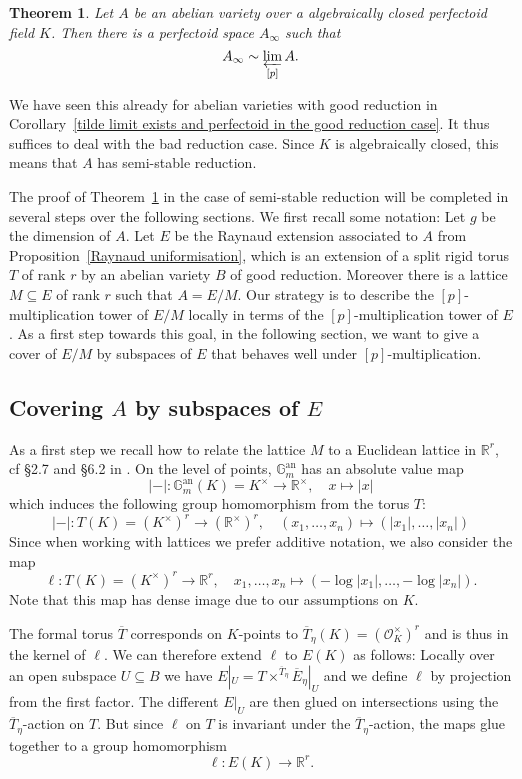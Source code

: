 \documentclass[10pt,oneside]{amsart}
\newtheorem{theorem}{Theorem}[section]
\theoremstyle{definition}
\begin{document}
	\begin{theorem}\label{main theorem}
		Let $A$ be an abelian variety over a  algebraically closed perfectoid field $K$. Then there is a perfectoid space $A_\infty$ such that
				\[A_\infty \sim \varprojlim_{[p]} A.\]
	\end{theorem}
	
	We have seen this already for abelian varieties with good reduction in Corollary~\ref{tilde limit exists and perfectoid in the good reduction case}. It thus suffices to deal with the bad reduction case. Since $K$ is algebraically closed, this means that $A$ has semi-stable reduction.
	
	The proof of Theorem~\ref{main theorem}  in the case of semi-stable reduction will be completed in several steps over the following sections.  We first recall some notation:  Let $g$ be the dimension of $A$. Let $E$ be the Raynaud extension associated to $A$ from Proposition~\ref{Raynaud uniformisation}, which is an extension of a split rigid torus $T$ of rank $r$ by an abelian variety $B$ of good reduction. Moreover there is a lattice $M\subseteq E$ of rank $r$ such that $A=E/M$. Our strategy is to describe the $[p]$-multiplication tower of $E/M$ locally in terms of the $[p]$-multiplication tower of $E$.
	As a first step towards this goal, in the following section, we want to give a cover of $E/M$ by subspaces of $E$ that behaves well under $[p]$-multiplication.
	
	\subsection{Covering $A$ by subspaces of $E$}
	As a first step we recall how to relate the lattice $M$ to a Euclidean lattice in $\mathbb R^r$, cf \S2.7 and \S6.2 in  \cite{rigid geometry of curves}. On the level of points, $\mathbb{G}_m^{\operatorname{an}}$ has an absolute value map
	\[|-|:\mathbb{G}_m^{\operatorname{an}}(K)=K^\times\rightarrow \mathbb R^\times, \quad x\mapsto |x|\]
	which induces the following group homomorphism from the torus $T$:
	\[|-|:T(K)=(K^\times)^r\rightarrow (\mathbb R^\times)^r, \quad (x_1,\dots,x_n)\mapsto (|x_1|,\dots,|x_n|)\]
	Since when working with lattices we prefer additive notation, we also consider the map
	\[\ell:T(K)=(K^\times)^r\rightarrow \mathbb R^r, \quad x_1,\dots,x_n\mapsto (-\log |x_1|,\dots,-\log |x_n|).\]
	Note that this map has dense image due to our assumptions on $K$.
	
		The formal torus $\overline{T}$ corresponds on $K$-points to $\overline{T}_\eta(K) = (\mathcal O_K^\times)^r$ and is thus in the kernel of $\ell$. We can therefore extend $\ell$ to $E(K)$ as follows: Locally over an open subspace $U\subseteq B$ we have $E|_U = T\times^{\overline{T}_\eta}\overline{E}_\eta|_{U}$ and we define $\ell$ by projection from the first factor. The different $E|_U$ are then glued on intersections using the $\overline{T}_\eta$-action on $T$. But since $\ell$ on $T$ is invariant under the $\overline{T}_\eta$-action, the maps glue together to a group homomorphism 
	\[\ell:E(K)\rightarrow \mathbb R^r.\]
	
\end{document}
